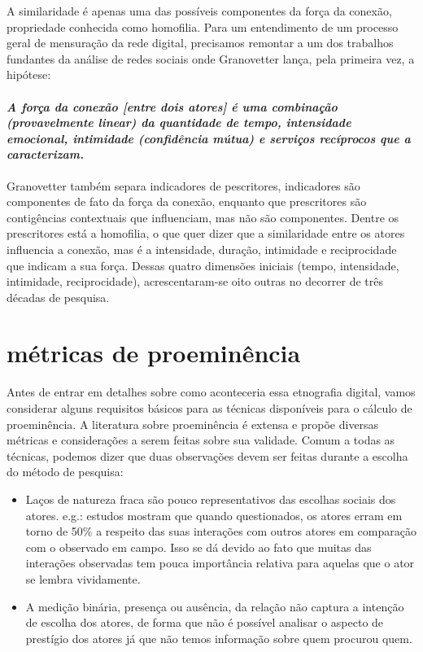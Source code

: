 \documentclass{article}
\begin{document}
A similaridade é apenas uma das possíveis componentes da força da conexão,
propriedade conhecida como homofilia. Para um entendimento de um processo geral
de mensuração da rede digital, precisamos remontar a um dos trabalhos fundantes
da análise de redes sociais onde Granovetter lança, pela primeira vez, a
hipótese:

\paragraph{\textit{A força da conexão [entre dois atores] é uma combinação
(provavelmente linear) da quantidade de tempo, intensidade emocional,
intimidade (confidência mútua) e serviços recíprocos que a
caracterizam.}\cite{Granovetter1973}}

Granovetter também separa indicadores de pescritores, indicadores são
componentes de fato da força da conexão, enquanto que prescritores são
contigências contextuais que influenciam, mas não são componentes. Dentre os
prescritores está a homofilia, o que quer dizer que a similaridade entre os
atores influencia a conexão, mas é a intensidade, duração, intimidade e
reciprocidade que indicam a sua força. Dessas quatro dimensões iniciais
(tempo, intensidade, intimidade, reciprocidade), acrescentaram-se oito outras no
decorrer de três décadas de pesquisa. 

\section{métricas de proeminência}

Antes de entrar em detalhes sobre como aconteceria essa etnografia digital,
vamos considerar alguns requisitos básicos para as técnicas disponíveis para o
cálculo de proeminência. A literatura sobre proeminência é extensa e propõe
diversas métricas e considerações a serem feitas sobre sua validade. Comum a
todas as técnicas, podemos dizer que duas observações devem ser feitas durante
a escolha do método de pesquisa:
\begin{itemize}
\item Laços de natureza fraca são pouco representativos das escolhas sociais dos
atores. e.g.: estudos mostram que quando questionados, os atores erram em torno
de 50\% a respeito das suas interações com outros atores em comparação com o
observado em campo. Isso se dá devido ao fato que muitas das interações
observadas tem pouca importância relativa para aquelas que o ator se lembra
vividamente.
\item A medição binária, presença ou ausência, da relação não captura a intenção
de escolha dos atores, de forma que não é possível analisar o aspecto de
prestígio dos atores já que não temos informação sobre quem procurou quem.
\end{itemize}
\end{document}
